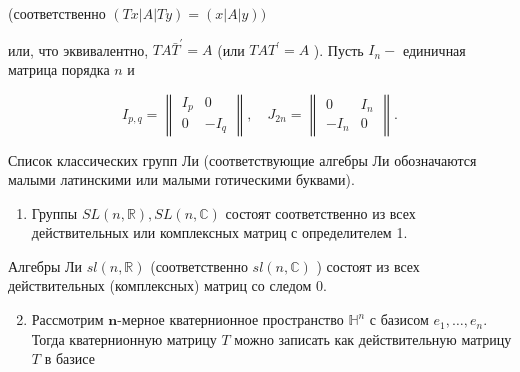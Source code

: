 \documentclass[10pt]{article}
\begin{document}
(соответственно $(T x|A| T y)=(x|A| y))$



или, что эквивалентно, $T A \bar{T}^{\prime}=A$ (или $T A T^{\prime}=A$ ). Пусть $I_{n}-$ единичная матрица порядка $n$ и



\[

I_{p, q}=\left\|\begin{array}{cc}

I_{p} & 0 \\

0 & -I_{q}

\end{array}\right\|, \quad J_{2 n}=\left\|\begin{array}{cc}

0 & I_{n} \\

-I_{n} & 0

\end{array}\right\| .

\]



Список классических групп Ли (соответствующие алгебры Ли обозначаются малыми латинскими или малыми готическими буквами).



\begin{enumerate}

  \item Группы $S L(n, \mathbb{R}), S L(n, \mathbb{C})$ состоят соответственно из всех действительных или комплексных матриц с определителем 1.

\end{enumerate}



Алгебры Ли $s l(n, \mathbb{R})$ (соответственно $s l(n, \mathbb{C})$ ) состоят из всех действительных (комплексных) матриц со следом 0.



\begin{enumerate}

  \setcounter{enumi}{1}

  \item Рассмотрим $\boldsymbol{n}$-мерное кватернионное пространство $\mathbb{H}^{n}$ с базисом $e_{1}, \ldots, e_{n}$. Тогда кватернионную матрицу $T$ можно записать как действительную матрицу $T$ в базисе

\end{enumerate}
\end{document}
